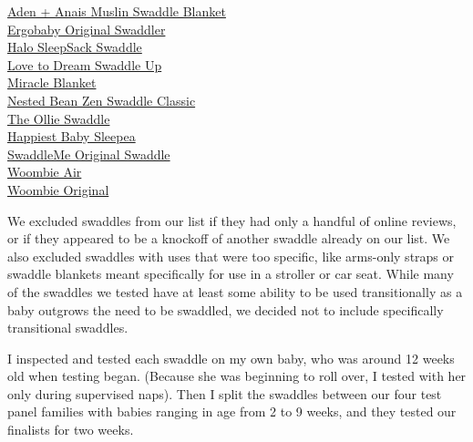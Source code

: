 \href{https://www.nytimes3xbfgragh.onion/wirecutter/out/link/30689/150980/4/86638/?merchant=Amazon}{Aden
+ Anais Muslin Swaddle Blanket}\\
\href{https://www.nytimes3xbfgragh.onion/wirecutter/out/link/30690/150981/4/86639/?merchant=Amazon}{Ergobaby
Original Swaddler}\\
\href{https://www.nytimes3xbfgragh.onion/wirecutter/out/link/30687/162166/4/86648/?merchant=BuyBuy\%20Baby}{Halo
SleepSack Swaddle}\\
\href{https://www.nytimes3xbfgragh.onion/wirecutter/out/link/30691/150982/4/86640/?merchant=Amazon}{Love
to Dream Swaddle Up}\\
\href{https://www.nytimes3xbfgragh.onion/wirecutter/out/link/30692/150983/4/86641/?merchant=Amazon}{Miracle
Blanket}\\
\href{https://www.nytimes3xbfgragh.onion/wirecutter/out/link/30693/150984/4/86642/?merchant=Amazon}{Nested
Bean Zen Swaddle Classic}\\
\href{https://www.nytimes3xbfgragh.onion/wirecutter/out/link/30694/150985/4/86643/?merchant=Amazon}{The
Ollie Swaddle}\\
\href{https://www.nytimes3xbfgragh.onion/wirecutter/out/link/30686/162165/4/86635/?merchant=BuyBuy\%20Baby}{Happiest
Baby Sleepea}\\
\href{https://www.nytimes3xbfgragh.onion/wirecutter/out/link/30695/150986/4/86644/?merchant=Amazon}{SwaddleMe
Original Swaddle}\\
\href{https://www.nytimes3xbfgragh.onion/wirecutter/out/link/30688/154051/4/86649/?merchant=BuyBuy\%20Baby}{Woombie
Air}\\
\href{https://www.nytimes3xbfgragh.onion/wirecutter/out/link/30697/150988/4/86645/?merchant=Amazon}{Woombie
Original}

We excluded swaddles from our list if they had only a handful of online
reviews, or if they appeared to be a knockoff of another swaddle already
on our list. We also excluded swaddles with uses that were too specific,
like arms-only straps or swaddle blankets meant specifically for use in
a stroller or car seat. While many of the swaddles we tested have at
least some ability to be used transitionally as a baby outgrows the need
to be swaddled, we decided not to include specifically transitional
swaddles.

I inspected and tested each swaddle on my own baby, who was around 12
weeks old when testing began. (Because she was beginning to roll over, I
tested with her only during supervised naps). Then I split the swaddles
between our four test panel families with babies ranging in age from 2
to 9 weeks, and they tested our finalists for two weeks.

